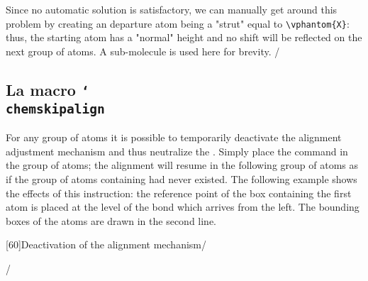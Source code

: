 \documentclass[10pt]{article}
\makeatletter
\newcommand\make@car@active[1]{%
	\catcode`#1\active
	\begingroup
		\lccode`\~`#1\relax
		\lowercase{\endgroup\def~}%
}
\newif\if@exstar
\newcommand\exemple{%
	\begingroup
	\parskip\z@
	\@makeother\;\@makeother\!\@makeother\?\@makeother\:%
	\@ifstar{\@exstartrue\exemple@}{\@exstarfalse\exemple@}}
\newcommand\exemple@[2][65]{%
	\medbreak\noindent
	\begingroup
		\let\do\@makeother\dospecials
		\make@car@active\ { {}}%
		\make@car@active\^^M{\par\leavevmode}%
		\make@car@active\^^I{\space\space}%
		\make@car@active\,{\leavevmode\kern\z@\string,}%
		\make@car@active\-{\leavevmode\kern\z@\string-}%
		\make@car@active\>{\leavevmode\kern\z@\string>}%
		\make@car@active\<{\leavevmode\kern\z@\string<}%
		\exemple@@{#1}{#2}%
}
\newcommand\exemple@@[3]{%
	\def\@tempa##1#3{\exemple@@@{#1}{#2}{##1}}%
	\@tempa
}
\newcommand\exemple@@@[3]{%
	\xdef\the@code{#3}%
	\endgroup
	\if@exstar
		\begingroup
			\fboxrule0.4pt
			\let\breakboxparindent\z@
			\def\bkvz@bottom{\hrule\@height\fboxrule}%
			\let\bkvz@before@breakbox\relax
			\def\bkvz@set@linewidth{\advance\linewidth\dimexpr-2\fboxrule-2\fboxsep}%
			\def\bkvz@left{\vrule\@width\fboxrule\hskip\fboxsep}%
			\def\bkvz@right{\hskip\fboxsep\vrule\@width\fboxrule}%
			\def\bkvz@top{\hbox to \hsize{%
				\vrule\@width\fboxrule\@height\fboxrule
				\leaders\bkvz@bottom\hfill
				\sffamily
				\fboxsep\z@
				\colorbox{black}{\kern0.25em\color{white}\footnotesize\lower0.5ex\hbox{\strut#2}\kern0.25em}%
				\leaders\bkvz@bottom\hfill
				\vrule\@width\fboxrule\@height\fboxrule}}%
			\breakbox
				\kern.5ex\relax
				\ttfamily\footnotesize\the@code\par
				\normalfont
				\kern3pt
				\hrule height0.1pt width\linewidth depth0.1pt
				\vskip5pt
				\rightskip0pt plus 1fill
				\everypar{{\color{lightgray}\rlap{\vrule height0.1pt width\linewidth depth0.1pt}}\hskip0pt plus 1fill}%
				\newlinechar`\^^M\everyeof{\noexpand}\scantokens{#3}\par
			\endbreakbox
		\endgroup
	\else
		\vskip0.5ex
		\boxput*(0,1)
			{\fboxsep\z@
			\hbox{\sffamily\colorbox{black}{\leavevmode\kern0.25em{\color{white}\footnotesize\strut#2}\kern0.25em}}%
			}%
			{\fboxsep5pt
			\fbox{%
				$\vcenter{\hsize\dimexpr0.#1\linewidth-\fboxsep-\fboxrule\relax
					\kern5pt\parskip0pt \ttfamily\footnotesize\the@code}%
				\vcenter{\kern5pt\hsize\dimexpr\linewidth-0.#1\linewidth-\fboxsep-\fboxrule\relax
					\everypar{{\color{lightgray}\rlap{\vrule height0.1pt width\dimexpr\linewidth-0.#1\linewidth-\fboxsep-\fboxrule depth0.1pt}}}%
					\footnotesize\newlinechar`\^^M\everyeof{\noexpand}\scantokens{#3}}$%
				}%
			}%
	\fi
	\medbreak
	\endgroup
}
\newcommand\falseverb[1]{{\ttfamily\detokenize\expandafter{\string#1}}}
\makeatother
\begin{document}
Since no automatic solution is satisfactory, we can manually get around this problem by creating an departure atom being a "strut" equal to \verb|\vphantom{X}|: thus, the starting atom has a "normal" height and no shift will be reflected on the next group of atoms. A sub-molecule is used here for brevity.
\exemple*{Bypassing vertical placement}/\Huge\setchemfig{atom sep=2em}
\definesubmol\I{\vphantom{X}}
\chemfig{A^1|!\I-B-C-D}\qquad
\chemfig{E_1|!\I-F-G-H}/
The disadvantage is that the first bond is too long because the departure atom now has a zero horizontal dimension.

If we are \emph{really sure} to understand the consequences that this will have on the molecule and especially if it lends itself to it, we can redefine \verb|\printatom| so that it forces the atom's bounding box to have fixed vertical dimensions; for example that of "$\mathrm{X^1_1}$".
\exemple*{Redefinition of \string\printatom}/\Huge\setchemfig{atom sep=2em}
\let\oldprintatom\printatom
\renewcommand\printatom[1]{%
	\begingroup
		\setbox0\hbox{\oldprintatom{X^1_1}}%
		\edef\tmp{\ht0=\the\ht0\relax\dp0=\the\dp0\box0 }%
		\setbox0\hbox{\oldprintatom{#1}}%
		\ifnum1\ifdim\ht0=0pt0\fi\ifdim\dp0=0pt0\fi\ifdim\wd0=0pt0\fi<1000
			\tmp
		\fi
	\endgroup
}
\qquad
{}/

\subsection{La macro \texttt{\char`\\chemskipalign}}\label{chemskipalign}
For any group of atoms it is possible to temporarily deactivate the alignment adjustment mechanism and thus neutralize the \falseverb{\vphantom}. Simply place the \falseverb{\chemskipalign} command in the group of atoms; the alignment will resume in the following group of atoms as if the group of atoms containing \falseverb{\chemskipalign} had never existed. The following example shows the effects of this instruction: the reference point of the box containing the first atom is placed at the level of the bond which arrives from the left. The bounding boxes of the atoms are drawn in the second line.

\exemple[60]{Deactivation of the alignment mechanism}/\large
{}\quad
{}\par\bigskip
\fboxsep=0pt
\renewcommand\printatom[1]{\fbox{\ensuremath{\mathrm{#1}}}}
\quad
{}/
\end{document}
